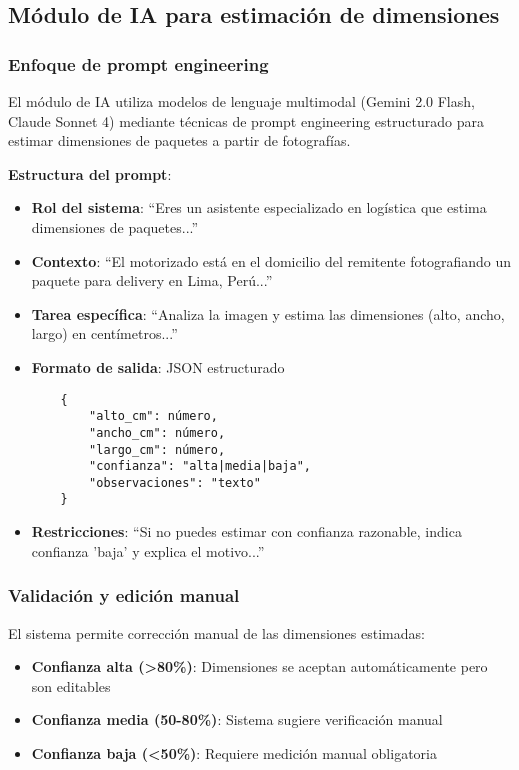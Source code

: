 \subsection{Módulo de IA para estimación de dimensiones}

\subsubsection{Enfoque de prompt engineering}

El módulo de IA utiliza modelos de lenguaje multimodal (Gemini 2.0 Flash, Claude Sonnet 4) mediante técnicas de prompt engineering estructurado para estimar dimensiones de paquetes a partir de fotografías.

\textbf{Estructura del prompt}:

\begin{itemize}
    \item \textbf{Rol del sistema}: ``Eres un asistente especializado en logística que estima dimensiones de paquetes...''
    
    \item \textbf{Contexto}: ``El motorizado está en el domicilio del remitente fotografiando un paquete para delivery en Lima, Perú...''
    
    \item \textbf{Tarea específica}: ``Analiza la imagen y estima las dimensiones (alto, ancho, largo) en centímetros...''
    
    \item \textbf{Formato de salida}: JSON estructurado
    \begin{verbatim}
    {
        "alto_cm": número,
        "ancho_cm": número,
        "largo_cm": número,
        "confianza": "alta|media|baja",
        "observaciones": "texto"
    }
    \end{verbatim}
    
    \item \textbf{Restricciones}: ``Si no puedes estimar con confianza razonable, indica confianza 'baja' y explica el motivo...''
\end{itemize}

\subsubsection{Validación y edición manual}

El sistema permite corrección manual de las dimensiones estimadas:

\begin{itemize}
    \item \textbf{Confianza alta (>80\%)}: Dimensiones se aceptan automáticamente pero son editables
    \item \textbf{Confianza media (50-80\%)}: Sistema sugiere verificación manual
    \item \textbf{Confianza baja (<50\%)}: Requiere medición manual obligatoria
\end{itemize}

